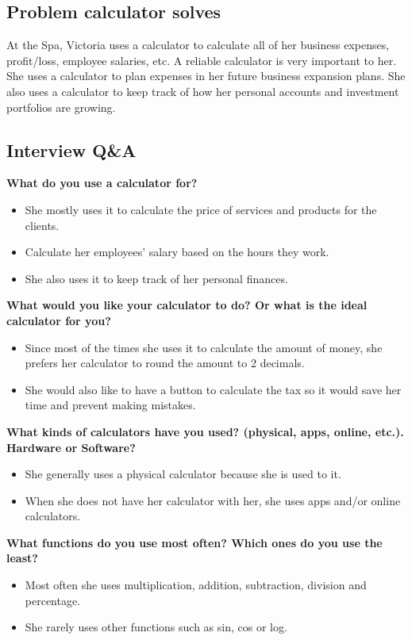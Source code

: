 \documentclass{article}
\begin{document}
\subsection*{Problem calculator solves}
At the Spa, Victoria uses a calculator to calculate all of her business expenses, profit/loss, employee salaries, etc. A reliable calculator is very important to her. She uses a calculator to plan expenses in her future business expansion plans.  She also uses a calculator to keep track of how her personal accounts and investment portfolios are growing. 
\pagebreak

\subsection*{Interview Q\&A}
\textbf{What do you use a calculator for?}
\begin{itemize}
\itemsep0em 
\item She mostly uses it to calculate the price of services and products for the clients. 
\item Calculate her employees’ salary based on the hours they work.
\item She also uses it to keep track of her personal finances.
\end{itemize}

\textbf{What would you like your calculator to do? Or what is the ideal calculator for you?}
\begin{itemize}
\itemsep0em 
\item Since most of the times she uses it to calculate the amount of money, she prefers her calculator to round the amount to 2 decimals.
\item She would also like to have a button to calculate the tax so it would save her time and prevent making mistakes.
\end{itemize}

\textbf{What kinds of calculators have you used? (physical, apps, online, etc.). Hardware or Software?}
\begin{itemize}
\itemsep0em 
\item She generally uses a physical calculator because she is used to it.
\item When she does not have her calculator with her, she uses apps and/or online calculators.
\end{itemize}

\textbf{What functions do you use most often? Which ones do you use the least?}
\begin{itemize}
\itemsep0em 
\item Most often she uses multiplication, addition, subtraction, division and percentage. 
\item She rarely uses other functions such as sin, cos or log.
\end{itemize}
\end{document}
